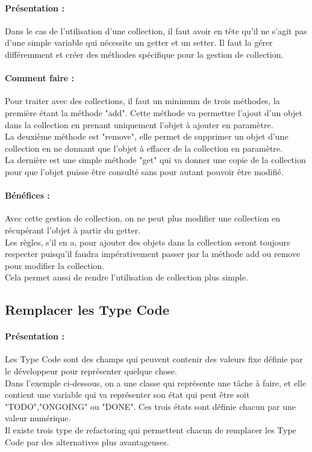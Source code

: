 \documentclass[a4paper,twoside,12pt,openright]{report}
\begin{document}
\paragraph{Présentation :}
Dans le cas de l'utilisation d'une collection, il faut avoir en tête qu'il ne s'agit pas d'une simple variable qui nécessite un getter et un setter. Il faut la gérer différemment et créer des méthodes spécifique pour la gestion de collection.

\paragraph{Comment faire :}
Pour traiter avec des collections, il faut un minimum de trois méthodes, la première étant la méthode "add". Cette méthode va permettre l'ajout d'un objet dans la collection en prenant uniquement l'objet à ajouter en paramètre.\\
La deuxième méthode est "remove", elle permet de supprimer un objet d'une collection en ne donnant que l'objet à effacer de la collection en paramètre.\\
La dernière est une simple méthode "get" qui va donner une copie de la collection pour que l'objet puisse être consulté sans pour autant pouvoir être modifié.

\paragraph{Bénéfices :}
Avec cette gestion de collection, on ne peut plus modifier une collection en récupérant l'objet à partir du getter.\\
Les règles, s'il en a, pour ajouter des objets dans la collection seront toujours respecter puisqu'il faudra impérativement passer par la méthode add ou remove pour modifier la collection.\\
Cela permet aussi de rendre l'utilisation de collection plus simple.\\

\subsection{Remplacer les Type Code}
\paragraph{Présentation :}
Les Type Code sont des champs qui peuvent contenir des valeurs fixe définie par le développeur pour représenter quelque chose.\\
Dans l'exemple ci-dessous, on a une classe qui représente une tâche à faire, et elle contient une variable qui va représenter son état qui peut être soit "TODO","ONGOING" ou "DONE". Ces trois états sont définie chacun par une valeur numérique.\\
Il existe trois type de refactoring qui permettent chacun de remplacer les Type Code par des alternatives plus avantageuses.
\end{document}
